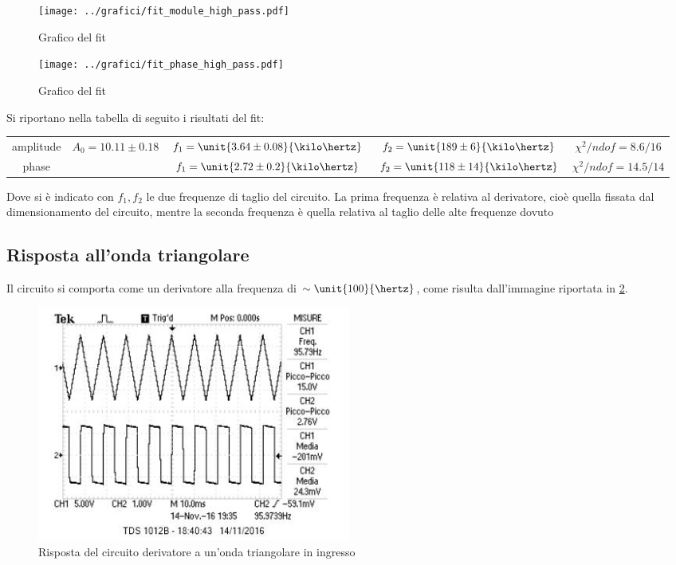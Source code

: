 \documentclass[10pt,a4paper]{article}
\begin{document}
\begin{figure}[h!]
\centering
	\begin{minipage}[h!]{0.48\textwidth}
		\centering
		\texttt{[image: ../grafici/fit\_module\_high\_pass.pdf]}
		\caption{Grafico del fit }
		\label{fig:highamp}
	\end{minipage}
	\begin{minipage}[h!]{0.48\textwidth}
		\centering
		\texttt{[image: ../grafici/fit\_phase\_high\_pass.pdf]}
		\caption{Grafico del fit }
		\label{fig:highph}
	\end{minipage}
\end{figure}

Si riportano nella tabella di seguito i risultati del fit:

\begin{table}[h!]
\centering
\begin{tabular}{c|cccc}
amplitude	&	$A_0 = 10.11 \pm 0.18$	&	$f_1 = \unit{3.64 \pm 0.08}{\kilo\hertz}$	&	$f_2 = \unit{189 \pm 6}{\kilo\hertz}$	&	$\chi^2/ndof = 8.6 / 16$\\
phase		& &	$f_1 = \unit{2.72 \pm 0.2}{\kilo\hertz}$	&	$f_2 = \unit{118 \pm 14}{\kilo\hertz}$	&	$\chi^2/ndof = 14.5 / 14$
\end{tabular}
\end{table}

\noindent Dove si è indicato con $f_1, f_2$ le due frequenze di taglio del circuito. La prima frequenza è relativa al derivatore, cioè quella fissata dal dimensionamento del circuito, mentre la seconda frequenza è quella relativa al taglio delle alte frequenze dovuto 

\subsection{Risposta all'onda triangolare}
Il circuito si comporta come un derivatore alla frequenza di $\sim \unit{100}{\hertz}$, come risulta dall'immagine riportata in \figurename{\ref{fig:trdev}}.

\begin{figure}[h!]
	\centering
	\includegraphics[width=0.5\textwidth]{../oscilloscopio/trdev.jpg}
	\caption{Risposta del circuito derivatore a un'onda triangolare in ingresso}
	\label{fig:trdev}
\end{figure}
\end{document}
